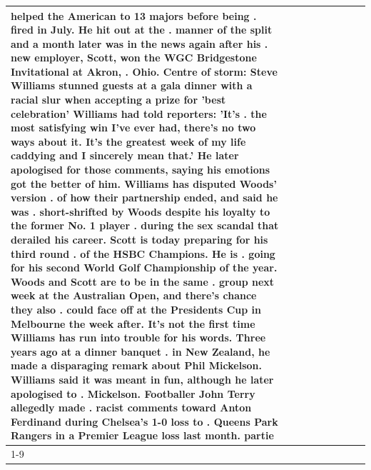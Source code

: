 \begin{table}[H]
\begin{tabular}{lllrlllll}
helped the American to 13 majors before being . fired in July. He hit out at the . manner of the split and a month later was in the news again after his . new employer, Scott, won the WGC Bridgestone Invitational at Akron, . Ohio. Centre of storm: Steve Williams stunned guests at a gala dinner with a racial slur when accepting a prize for 'best celebration' Williams had told reporters: 'It's . the most satisfying win I've ever had, there's no two ways about it. It's the greatest week of my life caddying and I sincerely mean that.' He later apologised for those comments, saying his emotions got the better of him. Williams has disputed Woods' version . of how their partnership ended, and said he was . short-shrifted by Woods despite his loyalty to the former No. 1 player . during the sex scandal that derailed his career. Scott is today preparing for his third round . of the HSBC Champions. He is . going for his second World Golf Championship of the year. Woods and Scott are to be in the same . group next week at the Australian Open, and there's chance they also . could face off at the Presidents Cup in Melbourne the week after. It's not the first time Williams has run into trouble for his words. Three years ago at a dinner banquet . in New Zealand, he made a disparaging remark about Phil Mickelson. Williams said it was meant in fun, although he later apologised to . Mickelson. Footballer John Terry allegedly made . racist comments toward Anton Ferdinand during Chelsea's 1-0 loss to . Queens Park Rangers in a Premier League loss last month. partie \\
\cline{1-9}

\end{tabular}
\end{table}
